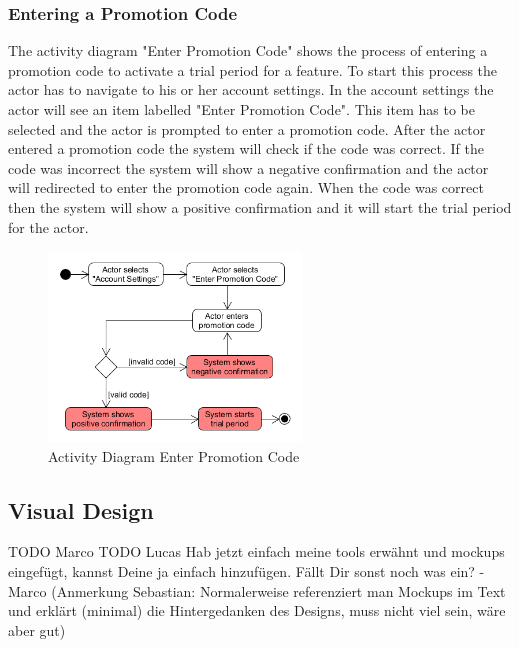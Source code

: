 \subsubsection{Entering a Promotion Code}
\label{sssec:entering_promotion_code}
The activity diagram "Enter Promotion Code" shows the process of entering a promotion code to activate a trial period for a feature. To start this process the actor has to navigate to his or her account settings. In the account settings the actor will see an item labelled "Enter Promotion Code". This item has to be selected and the actor is prompted to enter a promotion code. After the actor entered a promotion code the system will check if the code was correct. If the code was incorrect the system will show a negative confirmation and the actor will redirected to enter the promotion code again. When the code was correct then the system will show a positive confirmation and it will start the trial period for the actor.

\begin{figure}[H]
    \begin{center}
        \includegraphics[width=0.6\textwidth]{images/diagrams/activity_diagrams/ActivityDiagram_EnterPromotionCode.png}
        \caption{Activity Diagram Enter Promotion Code}
        \label{fig:activity_diagram_enter_promotion_code}
    \end{center}
\end{figure}

\subsection{Visual Design}
\label{ssec:visual_design}

TODO Marco TODO Lucas Hab jetzt einfach meine tools erwähnt und mockups eingefügt, kannst Deine ja einfach hinzufügen. Fällt Dir sonst noch was ein? - Marco (Anmerkung Sebastian: Normalerweise referenziert man Mockups im Text und erklärt (minimal) die Hintergedanken des Designs, muss nicht viel sein, wäre aber gut)

